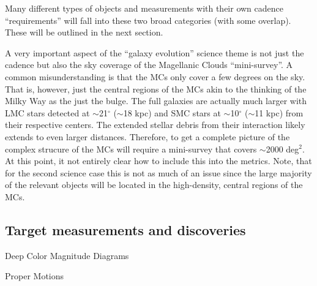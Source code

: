 Many different types of objects and measurements with their own cadence ``requirements'' will fall into
these two broad categories (with some overlap).  These will be outlined in the next section.

A very important aspect of the ``galaxy evolution'' science theme is not just the cadence but also the
sky coverage of the Magellanic Clouds ``mini-survey''.  A common misunderstanding is that the MCs only
cover a few degrees on the sky.  That is, however, just the central regions of the MCs akin to the thinking
of the Milky Way as the just the bulge.  The full galaxies are actually much larger with LMC stars
detected at $\sim$21$^{\circ}$ ($\sim$18 kpc) and SMC stars at $\sim$10$^{\circ}$ ($\sim$11 kpc) from their
respective centers.  The extended stellar debris from their interaction likely extends to even larger
distances.  Therefore, to get a complete picture of the complex strucure of the MCs will require a
mini-survey that covers $\sim$2000 deg$^2$.  At this point, it not entirely clear how to include this
into the metrics.  Note, that for the second science case this is not as much of an issue since the large
majority of the relevant objects will be located in the high-density, central regions of the MCs.



\subsection{Target measurements and discoveries}
\label{sec:keyword:targets}

%


\item Deep Color Magnitude Diagrams

\item Proper Motions

